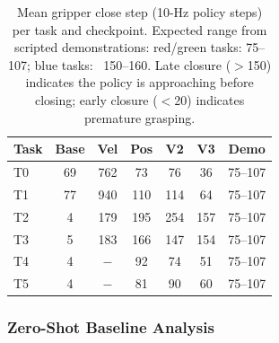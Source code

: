 \documentclass[conference, 12pt]{IEEEtran}
\begin{document}

\begin{table}[t]
\centering
\caption{Mean gripper close step (10-Hz policy steps) per task and checkpoint.
Expected range from scripted demonstrations: red/green tasks: 75–107; blue tasks: ~150–160.
Late closure ($>$150) indicates the policy is approaching before closing;
early closure ($<$20) indicates premature grasping.}
\label{tab:gripper}
\small
\begin{tabular}{@{}lcccccc@{}}
\toprule
\textbf{Task} & \textbf{Base} & \textbf{Vel} & \textbf{Pos} & \textbf{V2} & \textbf{V3} &
    \textbf{Demo} \\
\midrule
T0 & 69  & 762 & 73  & 76  & 36  & 75--107 \\
T1 & 77  & 940 & 110 & 114 & 64  & 75--107 \\
T2 & 4   & 179 & 195 & 254 & 157 & 75--107 \\
T3 & 5   & 183 & 166 & 147 & 154 & 75--107 \\
T4 & 4   & $-$ & 92  & 74  & 51  & 75--107 \\
T5 & 4   & $-$ & 81  & 90  & 60  & 75--107 \\
\bottomrule
\end{tabular}
\end{table}


\subsubsection{Zero-Shot Baseline Analysis}
\end{document}
